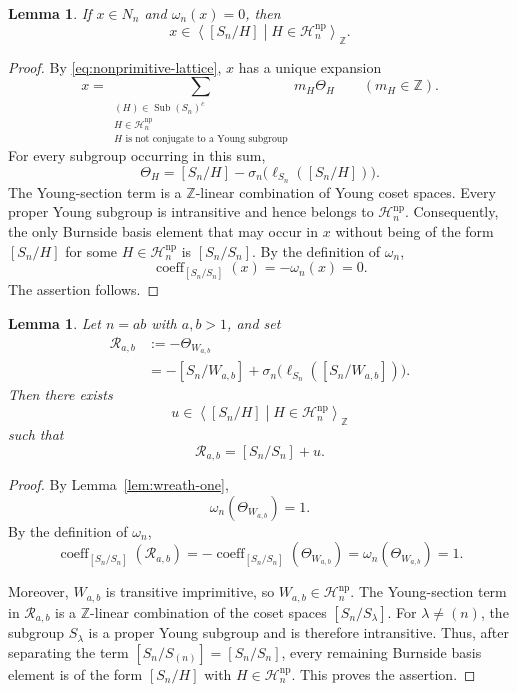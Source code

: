 \documentclass[a4paper,11pt]{article}
\numberwithin{equation}{section}
\newtheorem{lemma}[theorem]{Lemma}
\newcommand{\Z}{\mathbb{Z}}
\newcommand{\coeff}{\operatorname{coeff}}
\begin{document}
\begin{lemma}\label{lem:zero-support}
If $x\in N_n$ and $\omega_n(x)=0$, then
\[
  x\in
  \left\langle
    [S_n/H]
    \mathrel{}\middle|\mathrel{}
    H\in\mathcal H_n^{\mathrm{np}}
  \right\rangle_{\Z}.
\]
\end{lemma}

\begin{proof}
By \eqref{eq:nonprimitive-lattice}, $x$ has a unique expansion
\[
  x
  =
  \sum_{\substack{
    (H)\in\operatorname{Sub}(S_n)^c\\
    H\in\mathcal H_n^{\mathrm{np}}\\
    H\text{ is not conjugate to a Young subgroup}
  }}
  m_H\Theta_H
  \qquad
  (m_H\in\Z).
\]
For every subgroup occurring in this sum,
\[
  \Theta_H
  =
  [S_n/H]
  -
  \sigma_n\bigl(\ell_{S_n}([S_n/H])\bigr).
\]
The Young-section term is a $\Z$-linear combination of Young coset spaces.
Every proper Young subgroup is intransitive and hence belongs to
$\mathcal H_n^{\mathrm{np}}$. Consequently, the only Burnside basis element
that may occur in $x$ without being of the form $[S_n/H]$ for some
$H\in\mathcal H_n^{\mathrm{np}}$ is $[S_n/S_n]$. By the definition of
$\omega_n$,
\[
  \coeff_{[S_n/S_n]}(x)
  =
  -\omega_n(x)
  =
  0.
\]
The assertion follows.
\end{proof}

\begin{lemma}\label{lem:wreath-unit}
Let $n=ab$ with $a,b>1$, and set
\[
\begin{aligned}
  \mathcal R_{a,b}
  &:=-\Theta_{W_{a,b}}\\
  &=-[S_n/W_{a,b}]
  +\sigma_n\bigl(\ell_{S_n}([S_n/W_{a,b}])\bigr).
\end{aligned}
\]
Then there exists
\[
  u\in
  \left\langle
    [S_n/H]
    \mathrel{}\middle|\mathrel{}
    H\in\mathcal H_n^{\mathrm{np}}
  \right\rangle_{\Z}
\]
such that
\[
  \mathcal R_{a,b}=[S_n/S_n]+u.
\]
\end{lemma}

\begin{proof}
By Lemma~\ref{lem:wreath-one},
\[
  \omega_n(\Theta_{W_{a,b}})=1.
\]
By the definition of $\omega_n$,
\[
  \coeff_{[S_n/S_n]}(\mathcal R_{a,b})
  =
  -\coeff_{[S_n/S_n]}(\Theta_{W_{a,b}})
  =
  \omega_n(\Theta_{W_{a,b}})
  =
  1.
\]

Moreover, $W_{a,b}$ is transitive imprimitive, so
$W_{a,b}\in\mathcal H_n^{\mathrm{np}}$. The Young-section term in
$\mathcal R_{a,b}$ is a $\Z$-linear combination of the coset spaces
$[S_n/S_\lambda]$. For $\lambda\ne(n)$, the subgroup $S_\lambda$ is a proper
Young subgroup and is therefore intransitive. Thus, after separating the term
$[S_n/S_{(n)}]=[S_n/S_n]$, every remaining Burnside basis element is of the
form $[S_n/H]$ with $H\in\mathcal H_n^{\mathrm{np}}$. This proves the assertion.
\end{proof}
\end{document}
